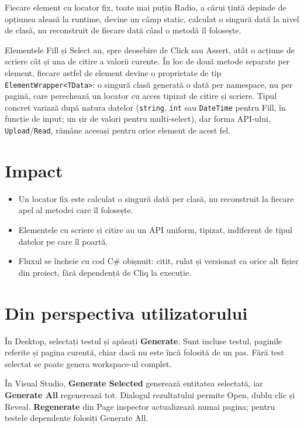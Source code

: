 \documentclass[12pt,a4paper]{report}
\newcommand{\UI}[1]{\textbf{#1}}
\newcommand{\File}[1]{\nolinkurl{#1}}
\begin{document}
Fiecare element cu locator fix, toate mai puțin Radio, a cărui țintă depinde de opțiunea aleasă la runtime, devine un câmp static, calculat o singură dată la nivel de clasă, nu reconstruit de fiecare dată când o metodă îl folosește.

Elementele Fill și Select au, spre deosebire de Click sau Assert, atât o acțiune de scriere cât și una de citire a valorii curente. În loc de două metode separate per element, fiecare astfel de element devine o proprietate de tip \File{ElementWrapper<TData>}: o singură clasă generată o dată per namespace, nu per pagină, care perechează un locator cu acces tipizat de citire și scriere. Tipul concret variază după natura datelor (\File{string}, \File{int} sau \File{DateTime} pentru Fill, în funcție de input; un șir de valori pentru multi-select), dar forma API-ului, \File{Upload}/\File{Read}, rămâne aceeași pentru orice element de acest fel.

\section{Impact}

\begin{itemize}
  \item Un locator fix este calculat o singură dată per clasă, nu reconstruit la fiecare apel al metodei care îl folosește.
  \item Elementele cu scriere și citire au un API uniform, tipizat, indiferent de tipul datelor pe care îl poartă.
  \item Fluxul se încheie cu cod C\# obișnuit: citit, rulat și versionat ca orice alt fișier din proiect, fără dependență de Cliq la execuție.
\end{itemize}

\section{Din perspectiva utilizatorului}

În Desktop, selectați testul și apăsați \UI{Generate}. Sunt incluse testul, paginile referite și pagina curentă, chiar dacă nu este încă folosită de un pas. Fără test selectat se poate genera workspace-ul complet.

În Visual Studio, \UI{Generate Selected} generează entitatea selectată, iar \UI{Generate All} regenerează tot. Dialogul rezultatului permite Open, dublu clic și Reveal. \UI{Regenerate} din Page inspector actualizează numai pagina; pentru testele dependente folosiți Generate All.
\end{document}

